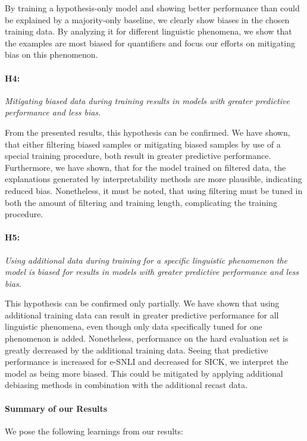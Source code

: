 By training a hypothesis-only model and showing better performance than could be explained by a majority-only baseline, we clearly show biases in the chosen training data. By analyzing it for different linguistic phenomena, we show that the examples are most biased for quantifiers and focus our efforts on mitigating bias on this phenomenon. 

\paragraph{H4:} \textit{Mitigating biased data during training results in models with greater predictive performance and less bias.}

From the presented results, this hypothesis can be confirmed. We have shown, that either filtering biased samples or mitigating biased samples by use of a special training procedure, both result in greater predictive performance. Furthermore, we have shown, that for the model trained on filtered data, the explanations generated by interpretability methods are more plausible, indicating reduced bias. Nonetheless, it must be noted, that using filtering must be tuned in both the amount of filtering and training length, complicating the training procedure.

\paragraph{H5:} \textit{Using additional data during training for a specific linguistic phenomenon the model is biased for results in models with greater predictive performance and less bias.}

This hypothesis can be confirmed only partially. We have shown that using additional training data can result in greater predictive performance for all linguistic phenomena, even though only data specifically tuned for one phenomenon is added. Nonetheless, performance on the hard evaluation set is greatly decreased by the additional training data. Seeing that predictive performance is increased for \acs{e-SNLI} and decreased for \acs{SICK}, we interpret the model as being more biased. This could be mitigated by applying additional debiasing methods in combination with the additional recast data.

\paragraph{Summary of our Results}

We pose the following learnings from our results:

